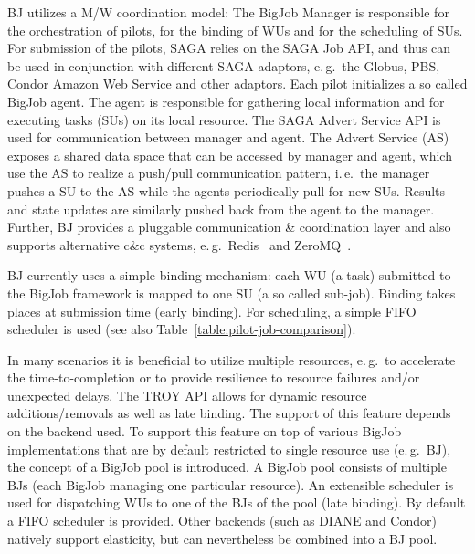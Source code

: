 \documentclass[conference,final]{IEEEtran}
\begin{document}

BJ utilizes a M/W coordination model: The BigJob Manager is responsible for the
orchestration of pilots, for the binding of WUs and for the scheduling of SUs.
For submission of the pilots, SAGA relies on the SAGA Job API, and thus can be
used in conjunction with different SAGA adaptors, e.\,g.\ the Globus, PBS,
Condor Amazon Web Service and other adaptors. Each pilot initializes a so called
BigJob agent. The agent is responsible for gathering local information and for
executing tasks (SUs) on its local resource. The SAGA Advert Service API is used
for communication between manager and agent. The Advert Service (AS) exposes a
shared data space that can be accessed by manager and agent, which use the AS to
realize a push/pull communication pattern, i.\,e.\ the manager pushes a SU to
the AS while the agents periodically pull for new SUs. Results and state updates
are similarly pushed back from the agent to the manager. Further, BJ provides a
pluggable communication \& coordination layer and also supports alternative c\&c
systems, e.\,g.\ Redis~\cite{redis} and ZeroMQ~\cite{zmq}.

BJ currently uses a simple binding mechanism: each WU (a task)
submitted to the BigJob framework is mapped to one SU (a so called
sub-job).  Binding takes places at submission time (early binding).
For scheduling, a simple FIFO scheduler is used (see also
Table~\ref{table:pilot-job-comparison}).




In many scenarios it is beneficial to utilize multiple resources, e.\,g.\ to
accelerate the time-to-completion or to provide resilience to resource failures
and/or unexpected delays. The TROY API allows for dynamic resource
additions/removals as well as late binding. The support of this feature depends
on the backend used. To support this feature on top of various BigJob
implementations that are by default restricted to single resource use (e.\,g.\
BJ), the concept of a BigJob pool is introduced. A BigJob pool consists of
multiple BJs (each BigJob managing one particular resource). An extensible
scheduler is used for dispatching WUs to one of the BJs of the pool (late
binding). By default a FIFO scheduler is provided. Other backends (such as DIANE
and Condor) natively support elasticity, but can nevertheless be combined into a
BJ pool.
\end{document}
